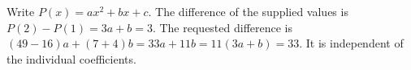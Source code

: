 Write $P(x)=ax^2+bx+c$. The difference of the supplied values is $P(2)-P(1)=3 a+b=3$. The requested difference is $(49-16)a+(7+4)b=33 a+11 b=11(3 a+b)=\boxed{33}$. It is independent of the individual coefficients.
